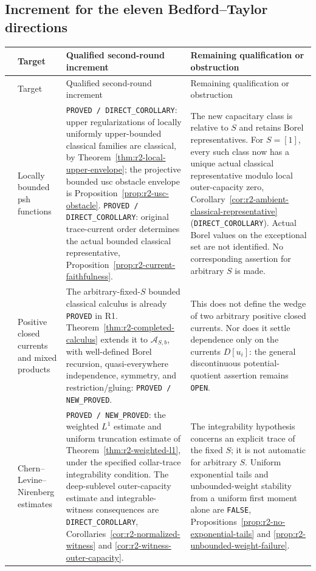 \documentclass[11pt,a4paper]{article}
\numberwithin{equation}{section}
\theoremstyle{definition}
\theoremstyle{remark}
\begin{document}
\subsection{Increment for the eleven Bedford--Taylor directions}

\begin{longtable}{@{}>{\raggedright\arraybackslash}p{}>{\raggedright\arraybackslash}p{}>{\raggedright\arraybackslash}p{}>{\raggedright\arraybackslash}p{}@{}}
\hline
 & Target & Qualified second-round increment & Remaining qualification or obstruction\\
\hline
\endfirsthead
\hline
 & Target & Qualified second-round increment & Remaining qualification or obstruction\\
\hline
\endhead
1 & Locally bounded psh functions &
\texttt{PROVED / DIRECT\_COROLLARY}: upper regularizations of locally
uniformly upper-bounded classical families are classical, by
Theorem~\ref{thm:r2-local-upper-envelope}; the projective bounded usc
obstacle envelope is Proposition~\ref{prop:r2-usc-obstacle}.
\texttt{PROVED / DIRECT\_COROLLARY}: original trace-current order determines
the actual bounded classical representative,
Proposition~\ref{prop:r2-current-faithfulness}. &
The new capacitary class is relative to $S$ and retains Borel
representatives. For $S=[1]$, every such class now has a unique
actual classical representative modulo local outer-capacity zero,
Corollary~\ref{cor:r2-ambient-classical-representative}
(\texttt{DIRECT\_COROLLARY}). Actual Borel values on the exceptional
set are not identified. No corresponding assertion for arbitrary
$S$ is made.\\[5pt]

2 & Positive closed currents and mixed products &
The arbitrary-fixed-$S$ bounded classical calculus is already
\texttt{PROVED} in R1. Theorem~\ref{thm:r2-completed-calculus} extends
it to $\mathcal A_{S,b}$, with well-defined Borel recursion,
quasi-everywhere independence, symmetry, and restriction/gluing:
\texttt{PROVED / NEW\_PROVED}. &
This does not define the wedge of two arbitrary positive closed
currents. Nor does it settle dependence only on the currents $D[u_i]$:
the general discontinuous potential-quotient assertion remains
\texttt{OPEN}.\\[5pt]

3 & Chern--Levine--Nirenberg estimates &
\texttt{PROVED / NEW\_PROVED}: the weighted $L^1$ estimate and uniform
truncation estimate of Theorem~\ref{thm:r2-weighted-l1}, under the
specified collar-trace integrability condition. The deep-sublevel
outer-capacity estimate and integrable-witness consequences are
\texttt{DIRECT\_COROLLARY},
Corollaries~\ref{cor:r2-normalized-witness} and
\ref{cor:r2-witness-outer-capacity}. &
The integrability hypothesis concerns an explicit trace of the fixed
$S$; it is not automatic for arbitrary $S$. Uniform exponential tails
and unbounded-weight stability from a uniform first moment alone are
\texttt{FALSE}, Propositions~\ref{prop:r2-no-exponential-tails} and
\ref{prop:r2-unbounded-weight-failure}.\\[5pt]


\end{longtable}
\end{document}
